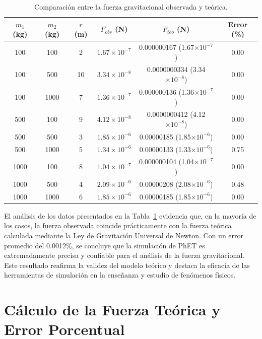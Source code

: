 \documentclass[a4paper,12pt]{article}
\begin{document}
\begin{table}[h]
    \centering
    \renewcommand{\arraystretch}{1.3}
    \begin{tabular}{cccccc}
        \toprule
        \textbf{$m_1$ (kg)} & \textbf{$m_2$ (kg)} & \textbf{$r$ (m)} 
        & \textbf{$F_{obs}$ (N)} 
        & \textbf{$F_{teo}$ (N)} 
        & \textbf{Error (\%)} \\
        \midrule
        100  & 100  & 2  & $1.67 \times 10^{-7}$ & 0.000000167 (1.67$\times 10^{-7}$)  & 0.00 \\
        100  & 500  & 10 & $3.34 \times 10^{-8}$ & 0.0000000334 (3.34$\times 10^{-8}$) & 0.00 \\
        100  & 1000 & 7  & $1.36 \times 10^{-7}$ & 0.000000136 (1.36$\times 10^{-7}$)  & 0.00 \\
        500  & 100  & 9  & $4.12 \times 10^{-8}$ & 0.0000000412 (4.12$\times 10^{-8}$) & 0.00 \\
        500  & 500  & 3  & $1.85 \times 10^{-6}$ & 0.00000185 (1.85$\times 10^{-6}$)   & 0.00 \\
        500  & 1000 & 5  & $1.34 \times 10^{-6}$ & 0.00000133 (1.33$\times 10^{-6}$)   & 0.75 \\
        1000 & 100  & 8  & $1.04 \times 10^{-7}$ & 0.000000104 (1.04$\times 10^{-7}$)  & 0.00 \\
        1000 & 500  & 4  & $2.09 \times 10^{-6}$ & 0.00000208 (2.08$\times 10^{-6}$)   & 0.48 \\
        1000 & 1000 & 6  & $1.85 \times 10^{-6}$ & 0.00000185 (1.85$\times 10^{-6}$)   & 0.00 \\
        \bottomrule
    \end{tabular}
    \caption{Comparación entre la fuerza gravitacional observada y teórica.}
    \label{tab:resultados}
\end{table}

El análisis de los datos presentados en la Tabla~\ref{tab:resultados} evidencia que, en la mayoría de los casos, la fuerza observada coincide prácticamente con la fuerza teórica calculada mediante la Ley de Gravitación Universal de Newton. Con un error promedio del 0.0012\%, se concluye que la simulación de PhET es extremadamente precisa y confiable para el análisis de la fuerza gravitacional. Este resultado reafirma la validez del modelo teórico y destaca la eficacia de las herramientas de simulación en la enseñanza y estudio de fenómenos físicos.

\newpage
\section*{Cálculo de la Fuerza Teórica y Error Porcentual}
\end{document}
